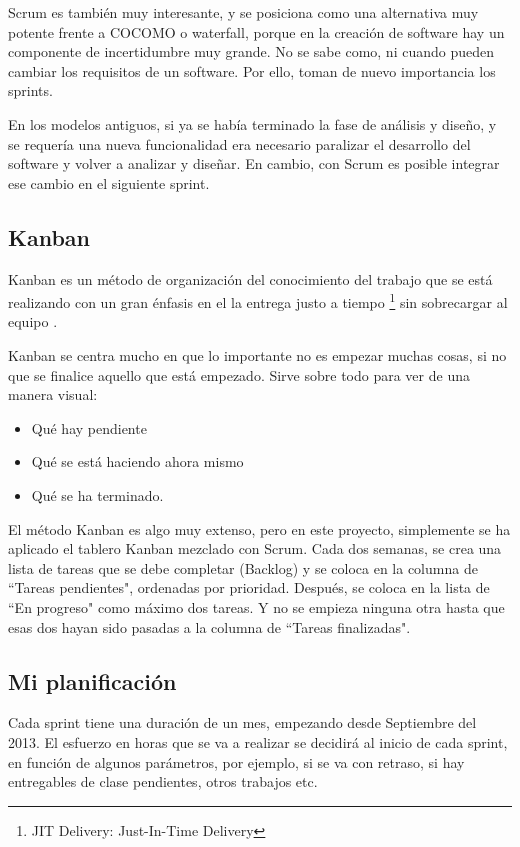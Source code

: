 Scrum es tambi\'en muy interesante, y se posiciona como una alternativa muy potente frente a 
COCOMO o waterfall, porque en la creaci\'on de software hay un componente de incertidumbre muy 
grande. No se sabe como, ni cuando pueden cambiar los requisitos de un 
software. Por ello, toman de nuevo importancia los sprints. 

En los modelos antiguos, si ya se hab\'ia terminado la fase de an\'alisis y dise\~no, y se requer\'ia una nueva funcionalidad era necesario 
paralizar el desarrollo del software y volver a analizar y diseñar. En cambio, con Scrum es 
posible integrar ese cambio en el siguiente sprint.

\subsection{Kanban}
Kanban es un m\'etodo de organizaci\'on del conocimiento del trabajo que se est\'a realizando con un gran \'enfasis en el la entrega justo a 
tiempo \footnote{JIT Delivery: Just-In-Time Delivery} sin sobrecargar al equipo \cite{Kanban:WhatIsIt}.

Kanban se centra mucho en que lo importante no es empezar muchas cosas, si no que se finalice
aquello que est\'a empezado. Sirve sobre todo 
para ver de una manera visual:
\begin{itemize}
    \item Qu\'e hay pendiente
    \item Qu\'e se est\'a haciendo ahora mismo
    \item Qu\'e se ha terminado.
\end{itemize}

El m\'{e}todo Kanban es algo muy extenso, pero en este proyecto, simplemente se ha aplicado el tablero Kanban mezclado con Scrum. 
Cada dos semanas, se crea una lista de tareas que se debe completar (Backlog) y se coloca en la columna de ``Tareas pendientes", 
ordenadas por prioridad. Despu\'es, se coloca en la lista de ``En progreso" como m\'{a}ximo dos tareas. Y no se empieza ninguna otra
 hasta que esas dos hayan sido pasadas a la columna de ``Tareas finalizadas".

\subsection{Mi planificaci\'{o}n}
Cada sprint tiene una duraci\'{o}n de un mes, empezando desde Septiembre del 2013. El esfuerzo en horas que se va a 
realizar se decidir\'a al inicio de cada sprint, en funci\'on de algunos par\'ametros, por ejemplo, si se va con retraso,
si hay entregables de clase pendientes, otros trabajos etc. 

